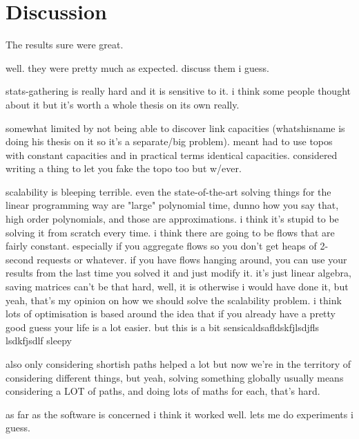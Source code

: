 \chapter{Discussion}
\label{ch:discussion}

The results sure were great.

well. they were pretty much as expected. discuss them i guess.

stats-gathering is really hard and it is sensitive to it. i think some people thought about it but it's worth a whole thesis on its own really.

somewhat limited by not being able to discover link capacities (whatshisname is doing his thesis on it so it's a separate/big problem). meant had to use topos with constant capacities and in practical terms identical capacities. considered writing a thing to let you fake the topo too but w/ever.

scalability is bleeping terrible. even the state-of-the-art solving things for the linear programming way are "large" polynomial time, dunno how you say that, high order polynomials, and those are approximations. i think it's stupid to be solving it from scratch every time. i think there are going to be flows that are fairly constant. especially if you aggregate flows so you don't get heaps of 2-second requests or whatever. if you have flows hanging around, you can use your results from the last time you solved it and just modify it. it's just linear algebra, saving matrices can't be that hard, well, it is otherwise i would have done it, but yeah, that's my opinion on how we should solve the scalability problem. i think lots of optimisation is based around the idea that if you already have a pretty good guess your life is a lot easier. but this is a bit sensicaldsafldskfjlsdjfls lsdkfjsdlf sleepy

also only considering shortish paths helped  a lot but now we're in the territory of considering different things, but yeah, solving something globally usually means considering a LOT of paths, and doing lots of maths for each, that's hard.

as far as the software is concerned i think it worked well. lets me do experiments i guess.

